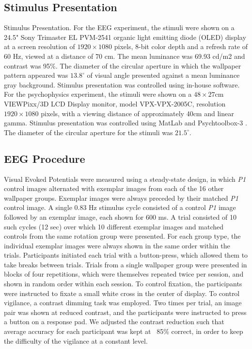 \documentclass[11pt, twoside]{article}
\begin{document}
\subsection*{Stimulus Presentation}
Stimulus Presentation. For the EEG experiment, the stimuli were shown on a 24.5" Sony Trimaster EL PVM-2541 organic light emitting diode (OLED) display at a screen resolution of $1920\times1080$ pixels, 8-bit color depth and a refresh rate of 60 Hz, viewed at a distance of 70 cm. The mean luminance was 69.93 cd/m2 and contrast was 95\%. The diameter of the circular aperture in which the wallpaper pattern appeared was $13.8^\circ$ of visual angle presented against a mean luminance gray background. Stimulus presentation was controlled using in-house software. For the psychophysics experiment, the stimuli were shown on a $48 \times 27$cm VIEWPixx/3D LCD Display monitor, model VPX-VPX-2005C, resolution $1920 \times 1080$ pixels, with a viewing distance of approximately 40cm and linear gamma. Stimulus presentation was controlled using MatLab and Psychtoolbox-3 \cite{kleiner2007,brainard1997spatial}. The diameter of the circular aperture for the stimuli was $21.5^\circ$.

\subsection*{EEG Procedure}
Visual Evoked Potentials were measured using a steady-state design, in which \textit{P1} control images alternated with exemplar images from each of the 16 other wallpaper groups. Exemplar images were always preceded by their matched \textit{P1} control image. A single 0.83 Hz stimulus cycle consisted of a control \textit{P1} image followed by an exemplar image, each shown for 600 ms. A trial consisted of 10 such cycles (12 sec) over which 10 different exemplar images and matched controls from the same rotation group were presented. For each group type, the individual exemplar images were always shown in the same order within the trials. Participants initiated each trial with a button-press, which allowed them to take breaks between trials. Trials from a single wallpaper group were presented in blocks of four repetitions, which were themselves repeated twice per session, and shown in random order within each session. To control fixation, the participants were instructed to fixate a small white cross in the center of display. To control vigilance, a contrast dimming task was employed. Two times per trial, an image pair was shown at reduced contrast, and the participants were instructed to press a button on a response pad. We adjusted the contrast reduction such that average accuracy for each participant was kept at ~85\% correct, in order to keep the difficulty of the vigilance at a constant level.
\end{document}
